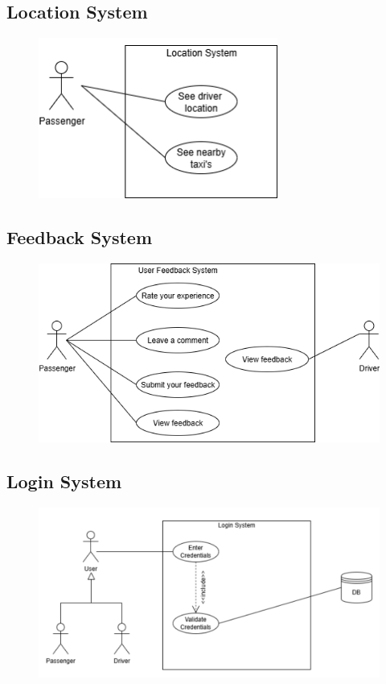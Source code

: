 \documentclass[a4paper,12pt]{article}
\begin{document}
    \subsection*{Location System}
    \begin{figure}[H]
      \centering
      \includegraphics[width=0.7\textwidth]{Location System.png} 
    \end{figure}
   
  \subsection*{Feedback System}
    \begin{figure}[H]
      \centering
      \includegraphics[width=1\textwidth]{Feedback.png} 
    \end{figure}
  \subsection*{Login System}
    \begin{figure}[H]
      \centering
      \includegraphics[width=1\textwidth]{Login.png} 
    \end{figure}
\end{document}
